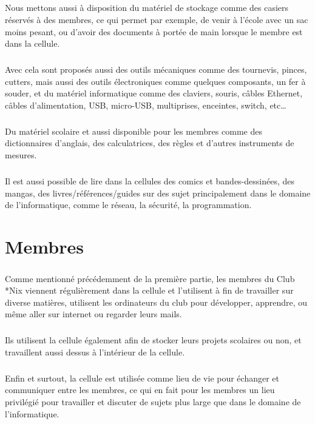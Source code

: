\documentclass[11pt]{report}
\begin{document}
\paragraph{} Nous mettons aussi à disposition du matériel de stockage comme des
casiers réservés à des membres, ce qui permet par exemple, de venir à l'école
avec un sac moins pesant, ou d'avoir des documents à portée de main lorsque le
membre est dans la cellule.

\paragraph{} Avec cela sont proposés aussi des outils mécaniques comme des
tournevis, pinces, cutters, mais aussi des outils électroniques comme quelques
composants, un fer à souder, et du matériel informatique comme des claviers,
souris, câbles Ethernet, câbles d'alimentation, USB, micro-USB, multiprises,
enceintes, switch, etc\ldots

\paragraph{} Du matériel scolaire et aussi disponible pour les membres comme
des dictionnaires d'anglais, des calculatrices, des règles et d'autres
instruments de mesures.

\paragraph{} Il est aussi possible de lire dans la cellules des comics et
bandes-dessinées, des mangas, des livres/références/guides sur des sujet
principalement dans le domaine de l'informatique, comme le réseau, la sécurité,
la programmation.

\chapter{Membres}

\paragraph{} Comme mentionné précédemment de la première partie, les membres du
Club *Nix viennent régulièrement dans la cellule et l'utilisent à fin de
travailler sur diverse matières, utilisent les ordinateurs du club pour
développer, apprendre, ou même aller sur internet ou regarder leurs mails.

\paragraph{} Ils utilisent la cellule également afin de stocker leurs projets
scolaires ou non, et travaillent aussi dessus à l'intérieur de la cellule.

\paragraph{} Enfin et surtout, la cellule est utilisée comme lieu de vie pour
échanger et communiquer entre les membres, ce qui en fait pour les membres un
lieu privilégié pour travailler et discuter de sujets plus large que dans le
domaine de l'informatique.
\end{document}
